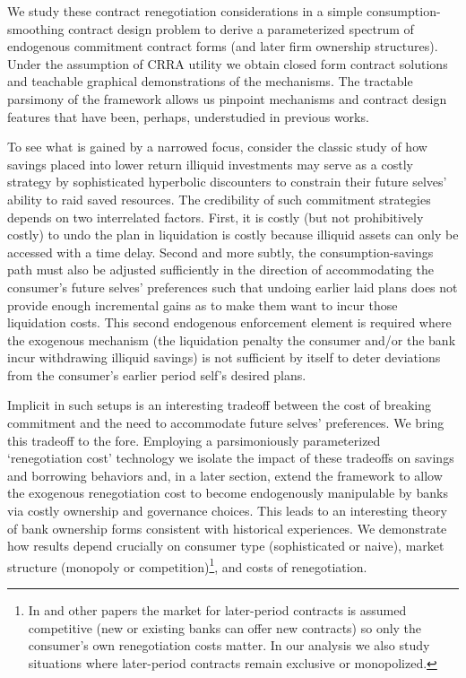 \documentclass[11pt,english]{article}
\theoremstyle{plain}
\theoremstyle{definition}
\begin{document}
 

We study these contract renegotiation considerations in a simple consumption-smoothing contract design problem to derive
a parameterized spectrum of endogenous commitment contract forms (and
later firm ownership structures). Under the assumption of CRRA utility we obtain closed form contract solutions
and teachable graphical demonstrations of the mechanisms. The tractable parsimony of the framework
allows us pinpoint mechanisms and contract design features
that have been, perhaps, understudied in previous works.  

To see what is gained by a narrowed focus, consider the classic \citet{laibson1997}
study of how savings placed into lower return illiquid investments
may serve as a costly strategy by sophisticated hyperbolic discounters
to constrain their future selves' ability to raid saved resources.
The credibility of such commitment strategies depends on two interrelated
factors. First, it is costly (but not prohibitively costly) to undo
the plan \textendash{} in \citet{laibson1997} liquidation is costly
because illiquid assets can only be accessed with a time delay.  Second
and more subtly, the consumption-savings path must also be adjusted
sufficiently in the direction of accommodating the consumer's future
selves' preferences such that undoing earlier laid plans does not provide enough
incremental gains as to make them want to incur those liquidation
costs. This second endogenous enforcement element is required where the exogenous mechanism (the liquidation penalty the consumer and/or the bank incur withdrawing illiquid savings)
is not sufficient by itself to deter deviations
from the consumer's earlier period self's desired plans.
 

Implicit in such setups is an interesting tradeoff between the cost
of breaking commitment and the need to accommodate future selves'
preferences. We bring this tradeoff to the fore. Employing a parsimoniously parameterized `renegotiation
cost' technology we isolate the impact of
these tradeoffs on savings and borrowing behaviors and, in a later section, extend the framework to allow the exogenous renegotiation cost to become endogenously manipulable by banks via costly ownership and governance choices. This leads to an interesting  theory of bank ownership forms consistent with historical experiences. We demonstrate how results depend crucially on consumer type (sophisticated or naive), market structure (monopoly or competition)\footnote
{In \citet{laibson1997} and other papers the market for later-period
contracts is assumed competitive (new or existing banks can offer
new contracts) so only the consumer's own renegotiation costs matter.
In our analysis we also study situations where later-period contracts
remain exclusive or monopolized. }, and costs of renegotiation.
\end{document}
